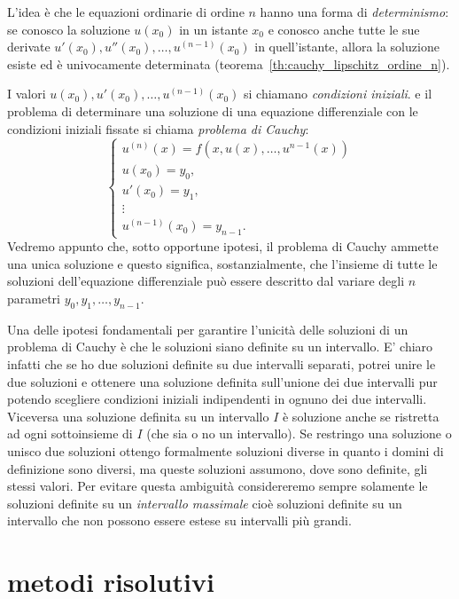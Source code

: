L'idea è che le equazioni ordinarie di ordine $n$ 
hanno una forma di \emph{determinismo}:
se conosco la soluzione $u(x_0)$ in un istante $x_0$ 
e conosco anche tutte le sue derivate $u'(x_0), u''(x_0), \dots, u^{(n-1)}(x_0)$ 
in quell'istante, allora la soluzione esiste ed è univocamente determinata
(teorema~\ref{th:cauchy_lipschitz_ordine_n}).

I valori $u(x_0), u'(x_0), \dots, u^{(n-1)}(x_0)$ si chiamano \emph{condizioni iniziali}.
e il problema di determinare una soluzione di una equazione differenziale
%
%
con le condizioni iniziali fissate si chiama \emph{problema di Cauchy}:
%
%
\[
  \begin{cases}
  u^{(n)}(x) = f(x, u(x), \dots, u^{n-1}(x))\\
  u(x_0) = y_0, \\
  u'(x_0) = y_1, \\
  \vdots\\
  u^{(n-1)}(x_0) = y_{n-1}.
  \end{cases}
\]
Vedremo appunto che, sotto opportune ipotesi, il problema di Cauchy
ammette una unica soluzione e questo significa, sostanzialmente,
che l'insieme di tutte le soluzioni dell'equazione differenziale
può essere descritto dal variare
degli $n$ parametri $y_0, y_1, \dots, y_{n-1}$.

Una delle ipotesi fondamentali per garantire l'unicità delle
soluzioni di un problema di Cauchy è che le soluzioni siano
definite su un intervallo. E' chiaro infatti che se ho due
soluzioni definite su due intervalli separati, potrei unire
le due soluzioni e ottenere una soluzione definita sull'unione dei
due intervalli pur potendo scegliere condizioni iniziali 
indipendenti in ognuno dei due intervalli. 
Viceversa una soluzione definita
su un intervallo $I$ è soluzione anche se ristretta ad ogni sottoinsieme
di $I$ (che sia o no un intervallo).
Se restringo una soluzione o unisco due soluzioni ottengo formalmente
soluzioni diverse in quanto i domini di definizione sono diversi, ma
queste soluzioni assumono, dove sono definite, gli stessi valori.
Per evitare questa ambiguità considereremo sempre solamente
le soluzioni definite su un \emph{intervallo massimale}%
 cioè
soluzioni definite su un intervallo che non possono essere
estese su intervalli più grandi.


\section{metodi risolutivi}

